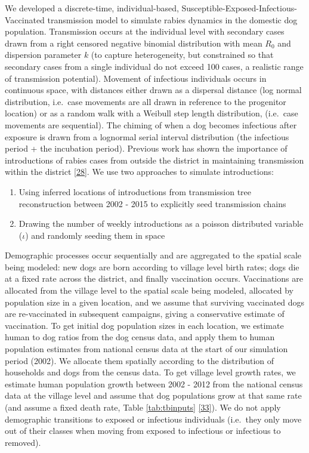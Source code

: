 \documentclass[
  oneside]{book}
\providecommand{\tightlist}{%
  \setlength{\itemsep}{0pt}\setlength{\parskip}{0pt}}
\begin{document}
We developed a discrete-time, individual-based, Susceptible-Exposed-Infectious-Vaccinated transmission model to simulate rabies dynamics in the domestic dog population. Transmission occurs at the individual level with secondary cases drawn from a right censored negative binomial distribution with mean \(R_{0}\) and dispersion parameter \(k\) (to capture heterogeneity, but constrained so that secondary cases from a single individual do not exceed 100 cases, a realistic range of transmission potential). Movement of infectious individuals occurs in continuous space, with distances either drawn as a dispersal distance (log normal distribution, i.e.~case movements are all drawn in reference to the progenitor location) or as a random walk with a Weibull step length distribution, (i.e.~case movements are sequential). The chiming of when a dog becomes infectious after exposure is drawn from a lognormal serial interval distribution (the infectious period + the incubation period). Previous work has shown the importance of introductions of rabies cases from outside the district in maintaining transmission within the district \protect\hyperlink{ref-Mancyinprep}{{[}28{]}}. We use two approaches to simulate introductions:

\begin{enumerate}
\def\labelenumi{\arabic{enumi})}
\tightlist
\item
  Using inferred locations of introductions from transmission tree reconstruction between 2002 - 2015 to explicitly seed transmission chains
\item
  Drawing the number of weekly introductions as a poisson distributed variable (\(\iota\)) and randomly seeding them in space
\end{enumerate}

Demographic processes occur sequentially and are aggregated to the spatial scale being modeled: new dogs are born according to village level birth rates; dogs die at a fixed rate across the district, and finally vaccination occurs. Vaccinations are allocated from the village level to the spatial scale being modeled, allocated by population size in a given location, and we assume that surviving vaccinated dogs are re-vaccinated in subsequent campaigns, giving a conservative estimate of vaccination. To get initial dog population sizes in each location, we estimate human to dog ratios from the dog census data, and apply them to human population estimates from national census data at the start of our simulation period (2002). We allocate them spatially according to the distribution of households and dogs from the census data. To get village level growth rates, we estimate human population growth between 2002 - 2012 from the national census data at the village level and assume that dog populations grow at that same rate (and assume a fixed death rate, Table \ref{tab:tbinputs} \protect\hyperlink{ref-czupryna2016}{{[}33{]}}). We do not apply demographic transitions to exposed or infectious individuals (i.e.~they only move out of their classes when moving from exposed to infectious or infectious to removed).
\end{document}
